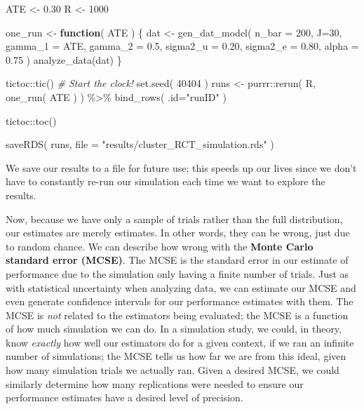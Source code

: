 \documentclass[
]{book}
\newenvironment{Shaded}{\begin{snugshade}}{\end{snugshade}}
\newcommand{\AttributeTok}[1]{\textcolor[rgb]{0.77,0.63,0.00}{#1}}
\newcommand{\CommentTok}[1]{\textcolor[rgb]{0.56,0.35,0.01}{\textit{#1}}}
\newcommand{\ControlFlowTok}[1]{\textcolor[rgb]{0.13,0.29,0.53}{\textbf{#1}}}
\newcommand{\DecValTok}[1]{\textcolor[rgb]{0.00,0.00,0.81}{#1}}
\newcommand{\FloatTok}[1]{\textcolor[rgb]{0.00,0.00,0.81}{#1}}
\newcommand{\FunctionTok}[1]{\textcolor[rgb]{0.00,0.00,0.00}{#1}}
\newcommand{\NormalTok}[1]{#1}
\newcommand{\OtherTok}[1]{\textcolor[rgb]{0.56,0.35,0.01}{#1}}
\newcommand{\SpecialCharTok}[1]{\textcolor[rgb]{0.00,0.00,0.00}{#1}}
\newcommand{\StringTok}[1]{\textcolor[rgb]{0.31,0.60,0.02}{#1}}
\begin{document}
\begin{Shaded}
\begin{Highlighting}[]
\NormalTok{ATE }\OtherTok{\textless{}{-}} \FloatTok{0.30}
\NormalTok{R }\OtherTok{\textless{}{-}} \DecValTok{1000}

\NormalTok{one\_run }\OtherTok{\textless{}{-}} \ControlFlowTok{function}\NormalTok{( ATE ) \{}
\NormalTok{  dat }\OtherTok{\textless{}{-}} \FunctionTok{gen\_dat\_model}\NormalTok{( }\AttributeTok{n\_bar =} \DecValTok{200}\NormalTok{, }\AttributeTok{J=}\DecValTok{30}\NormalTok{, }
                          \AttributeTok{gamma\_1 =}\NormalTok{ ATE, }\AttributeTok{gamma\_2 =} \FloatTok{0.5}\NormalTok{,}
                          \AttributeTok{sigma2\_u =} \FloatTok{0.20}\NormalTok{, }\AttributeTok{sigma2\_e =} \FloatTok{0.80}\NormalTok{,}
                          \AttributeTok{alpha =} \FloatTok{0.75}\NormalTok{ )}
  \FunctionTok{analyze\_data}\NormalTok{(dat)  }
\NormalTok{\}}

\NormalTok{tictoc}\SpecialCharTok{::}\FunctionTok{tic}\NormalTok{()  }\CommentTok{\# Start the clock!}
\FunctionTok{set.seed}\NormalTok{( }\DecValTok{40404}\NormalTok{ )}
\NormalTok{runs }\OtherTok{\textless{}{-}} 
\NormalTok{  purrr}\SpecialCharTok{::}\FunctionTok{rerun}\NormalTok{( R, }\FunctionTok{one\_run}\NormalTok{( ATE ) ) }\SpecialCharTok{\%\textgreater{}\%}
  \FunctionTok{bind\_rows}\NormalTok{( }\AttributeTok{.id=}\StringTok{"runID"}\NormalTok{ )}

\NormalTok{tictoc}\SpecialCharTok{::}\FunctionTok{toc}\NormalTok{()}

\FunctionTok{saveRDS}\NormalTok{( runs, }\AttributeTok{file =} \StringTok{"results/cluster\_RCT\_simulation.rds"}\NormalTok{ )}
\end{Highlighting}
\end{Shaded}

We save our results to a file for future use; this speeds up our lives since we don't have to constantly re-run our simulation each time we want to explore the results.

Now, because we have only a sample of trials rather than the full distribution, our estimates are merely estimates.
In other words, they can be wrong, just due to random chance.
We can describe how wrong with the \textbf{Monte Carlo standard error (MCSE)}.
The MCSE is the standard error in our estimate of performance due to the simulation only having a finite number of trials.
Just as with statistical uncertainty when analyzing data, we can estimate our MCSE and even generate confidence intervals for our performance estimates with them.
The MCSE is \emph{not} related to the estimators being evaluated; the MCSE is a function of how much simulation we can do.
In a simulation study, we could, in theory, know \emph{exactly} how well our estimators do for a given context, if we ran an infinite number of simulations; the MCSE tells us how far we are from this ideal, given how many simulation trials we actually ran.
Given a desired MCSE, we could similarly determine how many replications were needed to ensure our performance estimates have a desired level of precision.
\end{document}
